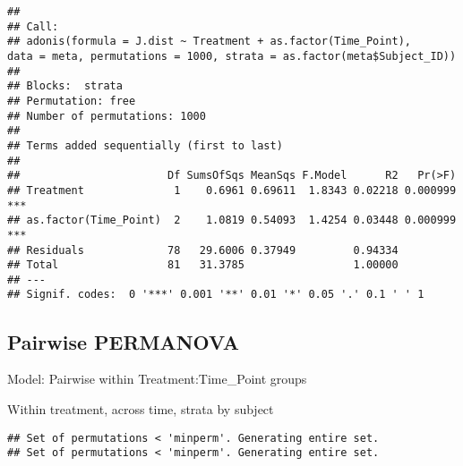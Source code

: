 \documentclass[]{article}
\newenvironment{Shaded}{\begin{snugshade}}{\end{snugshade}}
\newcommand{\KeywordTok}[1]{\textcolor[rgb]{0.13,0.29,0.53}{\textbf{#1}}}
\newcommand{\DataTypeTok}[1]{\textcolor[rgb]{0.13,0.29,0.53}{#1}}
\newcommand{\DecValTok}[1]{\textcolor[rgb]{0.00,0.00,0.81}{#1}}
\newcommand{\StringTok}[1]{\textcolor[rgb]{0.31,0.60,0.02}{#1}}
\newcommand{\OtherTok}[1]{\textcolor[rgb]{0.56,0.35,0.01}{#1}}
\newcommand{\OperatorTok}[1]{\textcolor[rgb]{0.81,0.36,0.00}{\textbf{#1}}}
\newcommand{\NormalTok}[1]{#1}
\begin{document}
\begin{Shaded}
\end{Shaded}

\begin{verbatim}
## 
## Call:
## adonis(formula = J.dist ~ Treatment + as.factor(Time_Point),      data = meta, permutations = 1000, strata = as.factor(meta$Subject_ID)) 
## 
## Blocks:  strata 
## Permutation: free
## Number of permutations: 1000
## 
## Terms added sequentially (first to last)
## 
##                       Df SumsOfSqs MeanSqs F.Model      R2   Pr(>F)    
## Treatment              1    0.6961 0.69611  1.8343 0.02218 0.000999 ***
## as.factor(Time_Point)  2    1.0819 0.54093  1.4254 0.03448 0.000999 ***
## Residuals             78   29.6006 0.37949         0.94334             
## Total                 81   31.3785                 1.00000             
## ---
## Signif. codes:  0 '***' 0.001 '**' 0.01 '*' 0.05 '.' 0.1 ' ' 1
\end{verbatim}

\subsection{Pairwise PERMANOVA}\label{pairwise-permanova}

Model: Pairwise within Treatment:Time\_Point groups

Within treatment, across time, strata by subject

\begin{Shaded}
\end{Shaded}

\begin{verbatim}
## Set of permutations < 'minperm'. Generating entire set.
## Set of permutations < 'minperm'. Generating entire set.
\end{verbatim}
\end{document}
